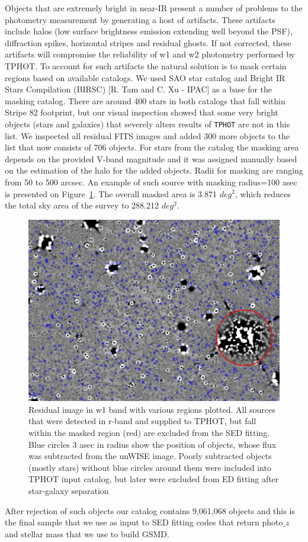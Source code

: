 Objects that are extremely bright in near-IR present a number of problems to the photometry measurement by generating a host of artifacts. These artifacts include halos (low surface brightness emission extending well beyond the PSF), diffraction spikes, horizontal stripes and residual ghosts.
If not corrected, these artifacts will compromise the reliability of w1 and w2 photometry performed by TPHOT. To account for such artifacts the natural solution is to mask certain regions based on available catalogs. We used SAO star catalog \citep{Staff1966} and Bright IR Stars Compilation (BIRSC) [R. Tam and C. Xu - IPAC] as a base for the masking catalog. There are around 400 stars in both catalogs that fall within Stripe 82 footprint, but our visual inspection showed that some very bright objects (stars and galaxies) that severely alters results of {\tt TPHOT} are not in this list. We inspected all residual FITS images and added 300 more objects to the list that now consists of 706 objects. For stars from the catalog the masking area depends on the provided V-band magnitude and it was assigned manually based on the estimation of the halo for the added objects. Radii for masking are ranging from 50 to 500 arcsec. An example of such source with masking radius=100 asec is presented on Figure~\ref{fig:masking}. The overall masked area is 3.871 $deg^{2}$, which reduces the total sky area of the survey to 288.212 $deg^{2}$.

\begin{figure}[!ht]
\includegraphics[width=5.7in]{Figures/CS_fits_region.png}
\caption{Residual image in w1 band with various regions plotted. All sources that were detected in r-band and supplied to TPHOT, but fall within the masked region (red) are excluded from the SED fitting. Blue circles 3 asec in radius show the position of objects, whose flux was subtracted from the unWISE image. Poorly subtracted objects (mostly stars) without blue circles around them were included into TPHOT input catalog, but later were excluded from ED fitting after star-galaxy separation}
\label{fig:masking}
\end{figure}

After rejection of such objects our catalog contains 9,061,068 objects and this is the final sample that we use as input to SED fitting codes that return photo$\_z$ and stellar mass that we use to build GSMD.